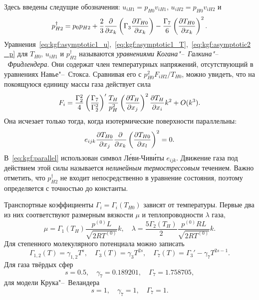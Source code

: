 Здесь введены следущие обозначения: \(u_{iH1} = p_{H0}v_{iH1}\), \(u_{iH2} = p_{H0}v_{iH2}\) и
\begin{equation}\label{eq:kgf:dag_pressure}
    p_{H2}^\dag = p_0 p_{H2}
        + \frac23\pder{x_k}\left(\Gamma_3\pder[T_{H0}]{x_k}\right)
        - \frac{\Gamma_7}{6}\left(\pder[T_{H0}]{x_k}\right)^2.
\end{equation}
Уравнения~\eqref{eq:kgf:asymptotic1_u},~\eqref{eq:kgf:asymptotic1_T},~\eqref{eq:kgf:asymptotic2_p}
для \(T_{H0}\), \(u_{iH1}\) и \(p_{H2}^\dag\) называются \emph{уравнениями Когана"--~Галкина"--~Фридлендера}.
Они содержат член температурных напряжений, отсутствующий в уравнениях Навье"--~Стокса.
Сравнивая его с \(p_{H0}^2F_{iH2}/T_{H0}\), можно увидеть, что на покоящуюся единицу массы газа действует сила
\begin{equation}\label{eq:kgf:gamma7_force}
    F_i = \frac{\Gamma_2^2}4\left(\frac{\Gamma_7}{\Gamma_2^2}\right)'\frac{T_H}{p_H^2}
        \left(\pder[T_H]{x_j}\right)^2 \pder[T_H]{x_i} k^2 + \OO{k^3}.
\end{equation}
Она исчезает только тогда, когда изотермические поверхности параллельны:
\begin{equation}\label{eq:kgf:parallel}
    e_{ijk}\pder[T_{H0}]{x_j}\pder{x_k}\left(\pder[T_{H0}]{x_l}\right)^2 = 0.
\end{equation}
В~\eqref{eq:kgf:parallel} использован символ Л\'{е}ви-Чив\'{и}ты \(e_{ijk}\).
Движение газа под действием этой силы называется \emph{нелинейным термострессовым} течением.
Важно отметить, что \(p_{H2}^\dag\) не входит непосредственно в уравнение состояния,
поэтому определяется с точностью до константы.

Транспортные коэффициенты \(\Gamma_i=\Gamma_i(T_{H0})\) зависят от температуры.
Первые два из них соответствуют размерным вязкости \(\mu\) и теплопроводности \(\lambda\) газа,
\begin{equation}\label{eq:mu_lambda}
    \mu = \Gamma_1(T_H) \frac{p^{(0)}L}{\sqrt{2RT^{(0)}}} k, \quad
    \lambda = \frac{5\Gamma_2(T_H)}{2} \frac{p^{(0)}RL}{\sqrt{2RT^{(0)}}} k.
\end{equation}
Для степенного молекулярного потенциала можно записать
\begin{equation}\label{eq:kgf:Gammas}
    \Gamma_{1,2}(T) = \gamma_{1,2}T^s, \quad \Gamma_3(T) = \gamma_3T^{2s},
        \quad \Gamma_7(T) = \Gamma_3' - \gamma_7T^{2s-1}.
\end{equation}
Для газа твёрдых сфер
\begin{equation}\label{eq:kgf:gammas}
    s=0.5, \quad \gamma_7 = 0.189201, \quad \Gamma_7 = 1.758705,
\end{equation}
для модели Крука"--~Веландера
\begin{equation}\label{eq:kgf:gammas_bgk}
    s=1, \quad \gamma_7 = 1, \quad \Gamma_7 = 1.
\end{equation}

